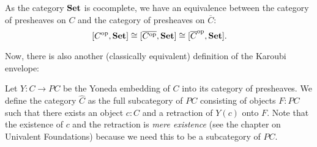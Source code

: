\begin{corollary}\label{cor:karoubi-presheaf}
  As the category $ \mathbf{Set} $ is cocomplete, we have an equivalence between the category of presheaves on $ C $ and the category of presheaves on $ \overline C $:
  \[ [C^{\text{op}}, \mathbf{Set}] \cong [\overline{C^{\text{op}}}, \mathbf{Set}] \cong [\overline C^{\text{op}}, \mathbf{Set}]. \]
\end{corollary}

Now, there is also another (classically equivalent) definition of the Karoubi envelope:
\begin{definition}\label{def:karoubi'}
  Let $ Y: C \to P C $ be the Yoneda embedding of $ C $ into its category of presheaves. We define the category $ \hat C $ as the full subcategory of $ P C $ consisting of objects $ F : P C $ such that there exists an object $ c: C $ and a retraction of $ Y(c) $ onto $ F $. Note that the existence of $ c $ and the retraction is \textit{mere existence} (see the chapter on Univalent Foundations) because we need this to be a subcategory of $ P C $.
\end{definition}

